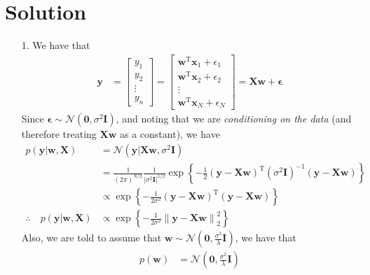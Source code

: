 \documentclass[submit]{../harvardml}
\newenvironment{solution}
  {\color{blue}\section*{Solution}}
{}
\begin{document}
\newpage
\begin{solution}

\begin{enumerate}
    \item [1.] We have that
    \begin{align*}
        \mathbf{y} &= \begin{bmatrix}
            y_1 \\ y_2 \\ \vdots \\ y_n
        \end{bmatrix} = \begin{bmatrix}
            \mathbf{w}^\mathrm{T}\mathbf{x}_1 + \epsilon_1 \\
            \mathbf{w}^\mathrm{T}\mathbf{x}_2 + \epsilon_2 \\
            \vdots \\
            \mathbf{w}^\mathrm{T}\mathbf{x}_N + \epsilon_N
        \end{bmatrix} = \mathbf{X}\mathbf{w} + \mathbf{\epsilon}
    \end{align*}
    Since $\mathbf{\epsilon} \sim \mathcal{N}\left(\mathbf{0}, \sigma^2\mathbf{I}\right)$, and noting that we are \textit{conditioning on the data} (and therefore treating $\mathbf{X}\mathbf{w}$ as a constant), we have
    \begin{align*}
        p(\mathbf{y} | \mathbf{w}, \mathbf{X}) &= \mathcal{N}\left(\mathbf{y} |  \mathbf{X}\mathbf{w}, \sigma^2\mathbf{I}\right) \\
        &= \frac{1}{(2\pi)^{N/2}}\frac{1}{\lvert \sigma^2\mathbf{I} \rvert^{1/2}} \exp \left\{ -\frac{1}{2}\left(\mathbf{y} - \mathbf{X}\mathbf{w}\right)^\mathrm{T}{\left(\sigma^2\mathbf{I}\right)}^{-1} \left( \mathbf{y} - \mathbf{X}\mathbf{w} \right) \right\} \\
        &\propto \exp \left\{ -\frac{1}{2\sigma^2}\left(\mathbf{y} - \mathbf{X}\mathbf{w}\right)^\mathrm{T}\left( \mathbf{y} - \mathbf{X}\mathbf{w} \right) \right\} \\
        \therefore \quad p(\mathbf{y} | \mathbf{w}, \mathbf{X}) &\propto \exp \left\{ -\frac{1}{2\sigma^2}\left\lVert \mathbf{y} - \mathbf{X}\mathbf{w}  \right\rVert_2^2 \right\} \tag*{(4.1.1)}
    \end{align*}
    Also, we are told to assume that $\mathbf{w} \sim \mathcal{N}\left( \mathbf{0}, \frac{\sigma^2}{\lambda}\mathbf{I}\right)$, we have that
    \begin{align*}
        p(\mathbf{w}) &= \mathcal{N}\left( \mathbf{0}, \frac{\sigma^2}{\lambda}\mathbf{I}\right) \\

\end{align*}
\end{enumerate}
\end{solution}
\end{document}
